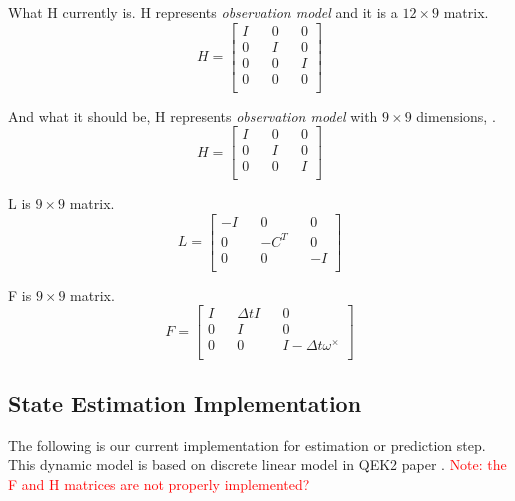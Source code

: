 \documentclass[letterpaper, 10 pt, conference]{ieeeconf}  %
\newcommand{\transpose}[1]{\ensuremath{#1^{\scriptscriptstyle T}}}
\begin{document}
What H currently is.
H represents \textit{observation model} and it is a \(12 \times 9\) matrix.
\begin{equation}
H =
\begin{bmatrix}
        I && 0 && 0  \\
        0 && I && 0  \\
        0 && 0 && I  \\
        0 && 0 && 0  \\
\end{bmatrix}
\end{equation}

And what it should be,
H represents \textit{observation model} with \(9 \times 9\) dimensions,  .
\begin{equation}
H =
\begin{bmatrix}
        I && 0 && 0  \\
        0 && I && 0  \\
        0 && 0 && I  \\
\end{bmatrix}
\end{equation}

L is \(9 \times 9\) matrix.
\begin{equation}
L =
\begin{bmatrix}
        -I && 0 && 0  \\
        0 && -\transpose{C} && 0  \\
        0 && 0 && -I  \\
\end{bmatrix}
\end{equation}


F is \(9 \times 9\) matrix.
\begin{equation}
F =
\begin{bmatrix}
        I && \Delta t   I && 0  \\
        0 && I && 0  \\
        0 && 0 && I- \Delta t \omega^{\times}  \\
\end{bmatrix}
\end{equation}


\subsection{State Estimation Implementation}
The following is our current implementation for estimation or prediction step.
This dynamic model is based on discrete linear model in QEK2 paper
\cite{rotella2014state}.
\textcolor{red}{Note: the F and H matrices are not properly implemented?}
\end{document}
